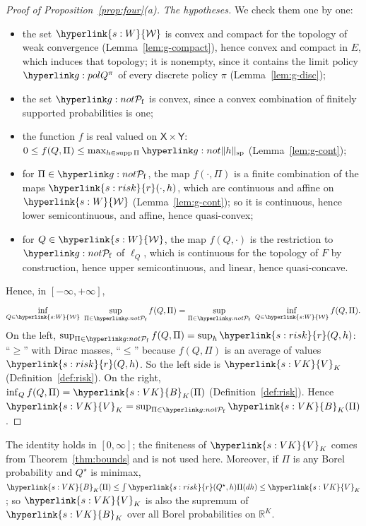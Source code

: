 \documentclass[11pt]{article}
\DeclareRobustCommand{\sy}[2]{{\hyperlink{#1}{#2}}}
\newcommand{\R}{\mathbb{R}}
\newcommand{\1}{\mathbf{1}}
\newcommand{\Wc}{\sy{s:W}{\mathcal W}}
\newcommand{\rk}{\sy{s:risk}{r}}
\newcommand{\VK}{\sy{s:VK}{V}}
\newcommand{\BK}{\sy{s:VK}{B}}
\begin{document}
\begin{proof}[Proof of Proposition~\ref{prop:four}(a)]
\textit{The hypotheses.} We check them one by one:
\begin{itemize}
\item the set $\Wc$ is convex and compact for the topology of weak convergence (Lemma~\ref{lem:g-compact}), hence convex and compact in $E$, which induces
that topology; it is nonempty, since it contains the limit policy $\gQp\pi$ of every discrete policy $\pi$ (Lemma~\ref{lem:g-disc});
\item the set $\gPf$ is convex, since a convex combination of finitely supported probabilities is one;
\item the function $f$ is real valued on $\mathsf X\times\mathsf Y$: $0\le f(Q,\Pi)\le\max_{h\in\mathrm{supp}\,\Pi}\gsp h$ (Lemma~\ref{lem:g-cont});
\item for $\Pi\in\gPf$, the map $f(\cdot,\Pi)$ is a finite combination of the maps $\rk(\cdot,h)$, which are continuous and affine on $\Wc$
(Lemma~\ref{lem:g-cont}); so it is continuous, hence lower semicontinuous, and affine, hence quasi-convex;
\item for $Q\in\Wc$, the map $f(Q,\cdot)$ is the restriction to $\gPf$ of $\ell_Q$, which is continuous for the topology of $F$ by construction, hence upper
semicontinuous, and linear, hence quasi-concave.
\end{itemize}
Hence, in $[-\infty,+\infty]$,
\[
\inf_{Q\in\Wc}\ \sup_{\Pi\in\gPf}f(Q,\Pi)=\sup_{\Pi\in\gPf}\ \inf_{Q\in\Wc}f(Q,\Pi).
\]
On the left, $\sup_{\Pi\in\gPf}f(Q,\Pi)=\sup_h\rk(Q,h)$: ``$\ge$'' with Dirac masses, ``$\le$'' because $f(Q,\Pi)$ is an average of values $\rk(Q,h)$.
So the left side is $\VK_K$ (Definition~\ref{def:risk}). On the right, $\inf_Qf(Q,\Pi)=\BK_K(\Pi)$ (Definition~\ref{def:risk}). Hence
$\VK_K=\sup_{\Pi\in\gPf}\BK_K(\Pi)$.
\end{proof}

\noindent The identity holds in $[0,\infty]$; the finiteness of $\VK_K$ comes from Theorem~\ref{thm:bounds} and is not used here. Moreover, if $\Pi$ is any Borel probability
and $Q^\star$ is minimax, $\BK_K(\Pi)\le\int\rk(Q^\star,h)\Pi(dh)\le\VK_K$; so $\VK_K$ is also the supremum of $\BK_K$ over all Borel probabilities on $\R^K$.
\end{document}
